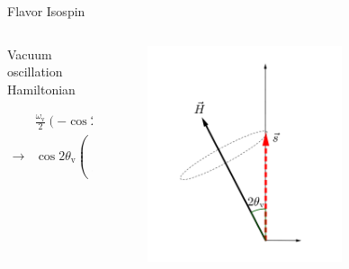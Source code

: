 \begin{frame}{Flavor Isospin}
\pause


\begin{columns}[T]
\begin{column}{0.5\textwidth}
\vspace{10pt}
Vacuum oscillation Hamiltonian

\begin{align*}
&\frac{\omega_{\mathrm v} }{2}\left( - \cos 2\theta_{\mathrm v } \boldsymbol{\sigma}_3  + \sin 2\theta_{\mathrm{v}} \boldsymbol{\sigma}_1\ \right)\\
\to & \cos 2\theta_{\mathrm v}\begin{pmatrix}
0\\
0\\
\omega_{\mathrm v}
\end{pmatrix} -\sin 2\theta_{\mathrm v}\begin{pmatrix}
\omega_{\mathrm v}\\
0\\
0
\end{pmatrix}
\end{align*}



\end{column}%
\begin{column}{0.5\textwidth}

\begin{figure}
\centering
\includegraphics[width=0.7\textwidth]{assets/flavor-isospin-1}
\end{figure}



\end{column}
\end{columns}




\end{frame}
